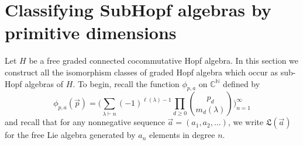 \documentclass[11pt]{amsart}
\theoremstyle{definition}
\numberwithin{equation}{section}
\def\NN{{\mathbb N}}
\def\CC{{\mathbb C}}
\newcommand{\mike}[1]{\todo[size=\tiny,color=green!30]{#1 \\ \hfill --- Mike}}
\newcommand{\lucas}[1]{\todo[size=\tiny,color=red!50]{#1 \\ \hfill --- Lucas}}
\begin{document}
%



\section{Classifying SubHopf algebras by primitive dimensions}

Let $H$ be a free graded connected cocommutative Hopf algebra.  
In this section we construct all the isomorphism classes of graded Hopf algebra which occur as sub-Hopf algebras of $H$.  
To begin, recall the function $\phi_{p, a}$ on $\CC^{\NN}$ defined by
\[
\phi_{p, a}(\vec{p}) = \big( \sum_{\lambda \vdash n} (-1)^{\ell(\lambda) - 1} \prod_{d \ge 0} \binom{p_{d}}{m_{d}(\lambda)} \big)_{n = 1}^{\infty}
\]
and recall that for any nonnegative sequence $\vec{a} = (a_{1}, a_{2}, \ldots)$, we write $\mathfrak{L}(\vec{a})$ for the free Lie algebra generated by $a_{n}$ elements in degree $n$.
\end{document}

